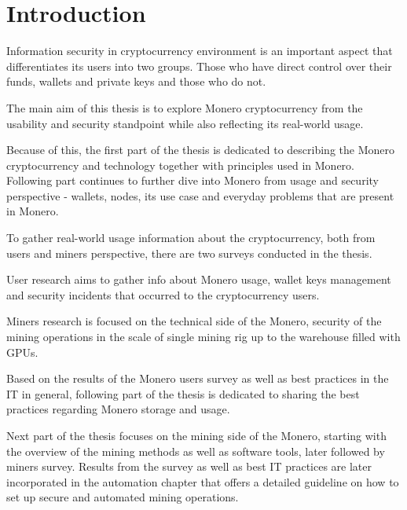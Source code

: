 \documentclass[
  printed, %
  table,   %
  lof,     %
  lot,     %
           oneside, color
]{fithesis3}
\begin{document}
\chapter{Introduction}
Information security in cryptocurrency environment is an important aspect that differentiates its users into two groups. Those who have direct control over their funds, wallets and private keys and those who do not.

The main aim of this thesis is to explore Monero cryptocurrency from the usability and security standpoint while also reflecting its real-world usage.

Because of this, the first part of the thesis is dedicated to describing the Monero cryptocurrency and technology together with principles used in Monero. Following part continues to further dive into Monero from usage and security perspective - wallets, nodes, its use case and everyday problems that are present in Monero.

To gather real-world usage information about the cryptocurrency, both from users and miners perspective, there are two surveys conducted in the thesis. 

User research aims to gather info about Monero usage, wallet keys management and security incidents that occurred to the cryptocurrency users. 

Miners research is focused on the technical side of the Monero, security of the mining operations in the scale of single mining rig up to the warehouse filled with GPUs. 

Based on the results of the Monero users survey as well as best practices in the IT in general, following part of the thesis is dedicated to sharing the best practices regarding Monero storage and usage.

Next part of the thesis focuses on the mining side of the Monero, starting with the overview of the mining methods as well as software tools, later followed by miners survey. Results from the survey as well as best IT practices are later incorporated in the automation chapter that offers a detailed guideline on how to set up secure and automated mining operations.

\end{document}
